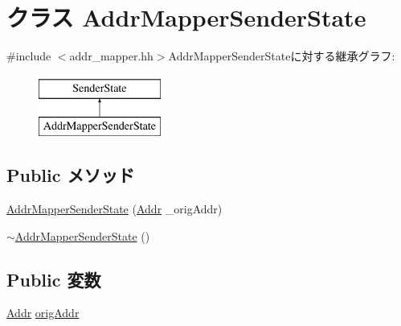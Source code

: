 \hypertarget{classAddrMapper_1_1AddrMapperSenderState}{
\section{クラス AddrMapperSenderState}
\label{classAddrMapper_1_1AddrMapperSenderState}
}


{\ttfamily \#include $<$addr\_\-mapper.hh$>$}AddrMapperSenderStateに対する継承グラフ:\begin{figure}[H]
\begin{center}
\leavevmode
\includegraphics[height=2cm]{classAddrMapper_1_1AddrMapperSenderState}
\end{center}
\end{figure}
\subsection*{Public メソッド}
\begin{DoxyCompactItemize}
\item 
\hyperlink{classAddrMapper_1_1AddrMapperSenderState_ad4879e163df1e1cf3466269e7d12d279}{AddrMapperSenderState} (\hyperlink{base_2types_8hh_af1bb03d6a4ee096394a6749f0a169232}{Addr} \_\-origAddr)
\item 
\hyperlink{classAddrMapper_1_1AddrMapperSenderState_a2dd0b868a2e7ae54d3a56dbdb0edfa60}{$\sim$AddrMapperSenderState} ()
\end{DoxyCompactItemize}
\subsection*{Public 変数}
\begin{DoxyCompactItemize}
\item 
\hyperlink{base_2types_8hh_af1bb03d6a4ee096394a6749f0a169232}{Addr} \hyperlink{classAddrMapper_1_1AddrMapperSenderState_a5a3998c45311174a053b237993cbbfe7}{origAddr}
\end{DoxyCompactItemize}


